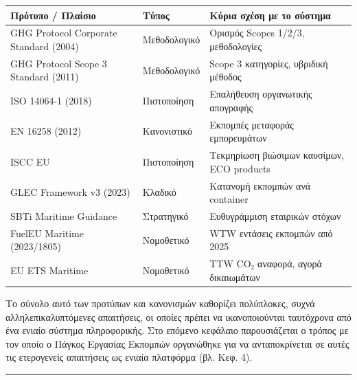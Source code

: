{\def\LTcaptype{} %
\begin{longtable}[]{@{}
  >{\raggedright\arraybackslash}p{}
  >{\raggedright\arraybackslash}p{}
  >{\raggedright\arraybackslash}p{}@{}}
\toprule\noalign{}
\begin{minipage}[b]{\linewidth}\raggedright
Πρότυπο / Πλαίσιο
\end{minipage} & \begin{minipage}[b]{\linewidth}\raggedright
Τύπος
\end{minipage} & \begin{minipage}[b]{\linewidth}\raggedright
Κύρια σχέση με το σύστημα
\end{minipage} \\
\midrule\noalign{}
\endhead
\bottomrule\noalign{}
\endlastfoot
GHG Protocol Corporate Standard (2004) & Μεθοδολογικό & Ορισμός Scopes
1/2/3, μεθοδολογίες \\
GHG Protocol Scope 3 Standard (2011) & Μεθοδολογικό & Scope 3
κατηγορίες, υβριδική μέθοδος \\
ISO 14064-1 (2018) & Πιστοποίηση & Επαλήθευση οργανωτικής απογραφής \\
EN 16258 (2012) & Κανονιστικό & Εκπομπές μεταφοράς εμπορευμάτων \\
ISCC EU & Πιστοποίηση & Τεκμηρίωση βιώσιμων καυσίμων, ECO products \\
GLEC Framework v3 (2023) & Κλαδικό & Κατανομή εκπομπών ανά container \\
SBTi Maritime Guidance & Στρατηγικό & Ευθυγράμμιση εταιρικών στόχων \\
FuelEU Maritime (2023/1805) & Νομοθετικό & WTW εντάσεις εκπομπών από
2025 \\
EU ETS Maritime & Νομοθετικό & TTW CO₂ αναφορά, αγορά δικαιωμάτων \\
\end{longtable}
}

Το σύνολο αυτό των προτύπων και κανονισμών καθορίζει πολύπλοκες, συχνά
αλληλεπικαλυπτόμενες απαιτήσεις, οι οποίες πρέπει να ικανοποιούνται
ταυτόχρονα από ένα ενιαίο σύστημα πληροφορικής. Στο επόμενο κεφάλαιο
παρουσιάζεται ο τρόπος με τον οποίο ο Πάγκος Εργασίας Εκπομπών
οργανώθηκε για να ανταποκρίνεται σε αυτές τις ετερογενείς απαιτήσεις ως
ενιαία πλατφόρμα (βλ. Κεφ. 4).

\begin{center}\rule{0.5\linewidth}{0.5pt}\end{center}

